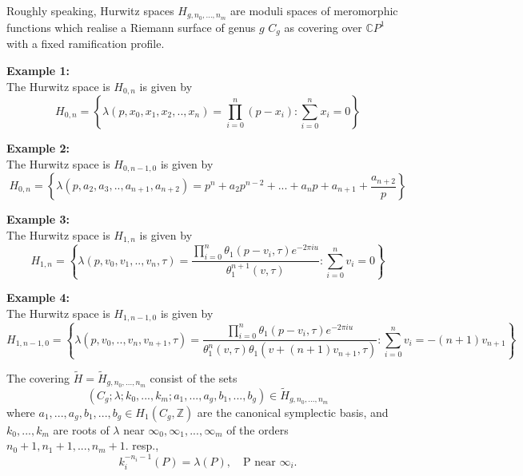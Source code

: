 \documentclass{article}
\theoremstyle{definition}
\begin{document}
Roughly speaking, Hurwitz spaces $H_{g,n_0 ,...,n_m}$ are moduli spaces of meromorphic functions which realise a Riemann surface of genus $g$ $C_g$ as covering over  $\mathbb{C}P ^1$ with a fixed ramification profile. 

\textbf{Example 1:}\\
The Hurwitz space is $H_{0,n}$ is  given by
\begin{equation*}
H_{0,n}=\left\{ \lambda(p,x_0,x_1,x_2,..,x_n)=\prod_{i=0}^n (p-x_i): \sum_{i=0}^n x_i=0\right\}
\end{equation*}

\textbf{Example 2:}\\
The Hurwitz space is $H_{0,n-1,0}$ is given by
\begin{equation*}
H_{0,n}=\left\{ \lambda(p,a_2,a_3,..,a_{n+1},a_{n+2})=p^n+ a_2p^{n-2}+...+a_np+a_{n+1}+\frac{a_{n+2}}{p}   \right\}
\end{equation*}

\textbf{Example 3:}\\
The Hurwitz space is $H_{1,n}$ is given by
\begin{equation*}
H_{1,n}=\left\{ \lambda(p,v_0,v_1,..,v_n,\tau)=\frac{\prod_{i=0}^n \theta_1(p-v_i,\tau)e^{-2\pi i u}}{\theta_1^{n+1}(v,\tau)}: \sum_{i=0}^n v_i=0   \right\}
\end{equation*}

\textbf{Example 4:}\\
The Hurwitz space is $H_{1,n-1,0}$ is given by
\begin{equation*}
H_{1,n-1,0}=\left\{ \lambda(p,v_0,..,v_n,v_{n+1},\tau)=\frac{\prod_{i=0}^n \theta_1(p-v_i,\tau)e^{-2\pi i u}}{\theta_1^{n}(v,\tau)\theta_1(v+(n+1)v_{n+1},\tau)}:\sum_{i=0}^n v_i=-(n+1)v_{n+1}   \right\}
\end{equation*}




The covering $\tilde H = \tilde H_{g,n_0 ,...,n_m} $ consist of the sets
\begin{equation*}
(C_g; \lambda; k_0, . . . , k_m; a_1, . . . , a_g, b_1, . . . , b_g) \in \tilde H_{g,n_0 ,...,n_m}
\end{equation*}
where $a_1, . . . , a_g, b_1, . . . , b_g \in H_1(C_g,\mathbb{Z})$ are the canonical symplectic basis, and  $k_0, . . . , k_m $ are  roots of $\lambda$ near  $\infty_0 ,\infty_1 , . . . , \infty_m$  of the orders
$n_0 + 1, n_1 + 1, . . . , n_m + 1.$ resp., 
\begin{equation*}
k^{-n_i-1}_i (P) = \lambda(P),\quad  \text{P near $\infty_i$}.
\end{equation*}
\end{document}
